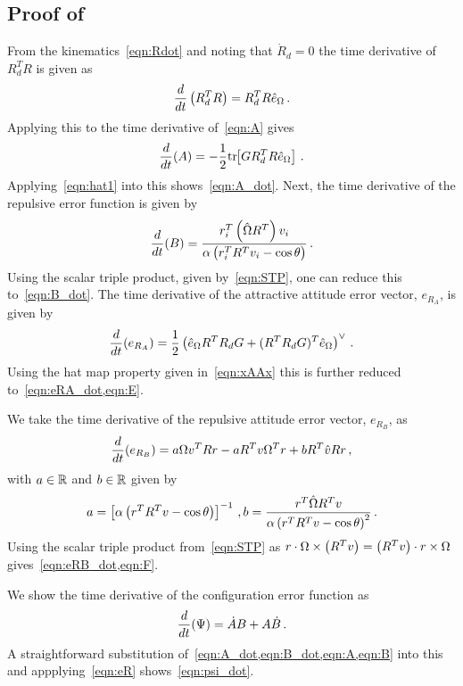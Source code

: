 \documentclass[letterpaper, 10 pt, conference]{ieeeconf}  %
\begin{document}
\subsection{Proof of~}\label{proof:error_dyn}
From the kinematics~\cref{eqn:Rdot} and noting that \( \dot{R}_d = 0 \) the time derivative of \( R_d^T R \) is given as
\begin{gather*}
	\frac{d }{d t} \left( R_d^T R \right) = R_d^T R \hat{e}_\Omega \, .
\end{gather*}
Applying this to the time derivative of~\cref{eqn:A} gives
\begin{gather*}
	\frac{d }{d t} (A) = -\frac{1}{2} \mathrm{tr}\negthickspace\left[ G R_d^T R \hat{e}_\Omega \right] \, .
\end{gather*}
Applying~\cref{eqn:hat1} into this shows~\cref{eqn:A_dot}.
Next, the time derivative of the repulsive error function is given by
\begin{gather*}
	\frac{d }{d t} (B) = \frac{r_i^T \left( \hat{\Omega} R^T \right) v_i}{\alpha \left( r_i^T R^T v_i - \cos \theta \right)} \, .
\end{gather*}
Using the scalar triple product, given by~\cref{eqn:STP}, one can reduce this to~\cref{eqn:B_dot}.
The time derivative of the attractive attitude error vector, \( e_{R_A} \), is given by
\begin{gather*}
	\frac{d }{d t} ( e_{R_A}) = \frac{1}{2} \left( \hat{e}_\Omega R^T R_d G + (R^T R_d G)^T \hat{e}_\Omega \right)^\vee \, .
\end{gather*}
Using the hat map property given in~\cref{eqn:xAAx} this is further reduced to~\cref{eqn:eRA_dot,eqn:E}.

We take the time derivative of the repulsive attitude error vector, \( e_{R_B} \), as
\begin{gather*}
	\frac{d }{d t}( e_{R_B} )= a \Omega v^T R r - a R^T v \Omega^T r + b R^T \hat{v} R r \, ,
\end{gather*}
with \( a \in \mathbb{R} \) and \( b \in \mathbb{R}\) given by 
\begin{gather*}
	a = \left[ \alpha \left( r^T R^T v - \cos \theta \right) \right]^{-1} \, ,
	b = \frac{r^T \hat{\Omega} R^T v}{\alpha \left( r^T R^T v - \cos \theta \right)^2} \, .
\end{gather*}
Using the scalar triple product from~\cref{eqn:STP} as \( r \cdot \Omega \times \left( R^T v \right) = \left( R^T v \right) \cdot r \times \Omega \) gives~\cref{eqn:eRB_dot,eqn:F}.

We show the time derivative of the configuration error function as
\begin{gather*}
	\frac{d }{d t} (\Psi) = \dot{A} B + A \dot{B} \, .
\end{gather*}
A straightforward substitution of~\cref{eqn:A_dot,eqn:B_dot,eqn:A,eqn:B} into this and appplying~\cref{eqn:eR} shows~\cref{eqn:psi_dot}.
\end{document}
